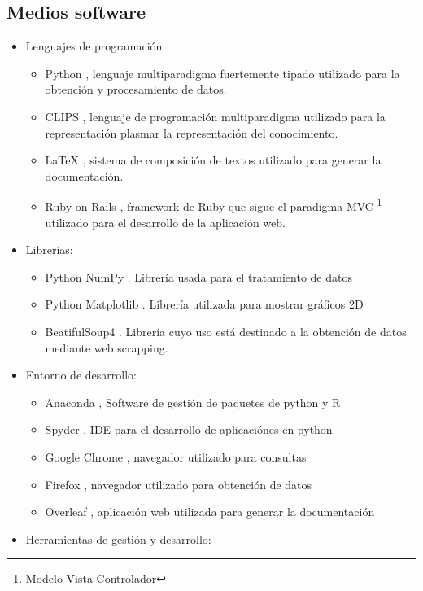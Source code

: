 \documentclass[11pt,a4paper,twoside,final]{article}
\begin{document}
\subsection{Medios software}
\begin{itemize}
    \item Lenguajes de programación:
    \begin{itemize}
        \item Python \cite{python}, lenguaje multiparadigma fuertemente tipado utilizado para la obtención y procesamiento de datos.
        \item CLIPS \cite{clips}, lenguaje de programación multiparadigma utilizado para la representación plasmar la representación del conocimiento.
        \item LaTeX \cite{latex}, sistema de composición de textos utilizado para generar la documentación.
        \item Ruby on Rails \cite{ror}, framework de Ruby que sigue el paradigma MVC \footnote{Modelo Vista Controlador} utilizado para el desarrollo de la aplicación web.
    \end{itemize}
    \item Librerías:
    \begin{itemize}
        \item Python NumPy \cite{numpy}. Librería usada para el tratamiento de datos
        \item Python Matplotlib \cite{matplotlib}. Librería utilizada para mostrar gráficos 2D
        \item BeatifulSoup4 \cite{beatifulsoup}. Librería cuyo uso está destinado a la obtención de datos mediante web scrapping.
    \end{itemize}
    \item Entorno de desarrollo:
    \begin{itemize}
        \item Anaconda \cite{anaconda}, Software de gestión de paquetes de python y R
        \item Spyder \cite{spyder}, IDE para el desarrollo de aplicaciónes en python
        \item Google Chrome \cite{chrome}, navegador utilizado para consultas
        \item Firefox \cite{firefox}, navegador utilizado para obtención de datos
        \item Overleaf \cite{overleaf}, aplicación web utilizada para generar la documentación
    \end{itemize}
    \item Herramientas de gestión y desarrollo:

\end{itemize}
\end{document}
